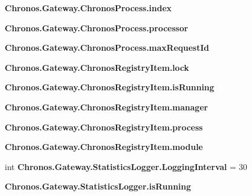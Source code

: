 \begin{DoxyCompactItemize}
\item 
{\bfseries Chronos.\+Gateway.\+Chronos\+Process.\+index}\hypertarget{group__Chronos_gacac8ee011937d5c05c5296d53697dc04}{}\label{group__Chronos_gacac8ee011937d5c05c5296d53697dc04}

\item 
{\bfseries Chronos.\+Gateway.\+Chronos\+Process.\+processor}\hypertarget{group__Chronos_ga3bf9ce85da5db54cf7487119bb7b3bfe}{}\label{group__Chronos_ga3bf9ce85da5db54cf7487119bb7b3bfe}

\item 
{\bfseries Chronos.\+Gateway.\+Chronos\+Process.\+max\+Request\+Id}\hypertarget{group__Chronos_ga1a32157777fccaa0507bb2218d55b199}{}\label{group__Chronos_ga1a32157777fccaa0507bb2218d55b199}

\item 
{\bfseries Chronos.\+Gateway.\+Chronos\+Registry\+Item.\+lock}\hypertarget{group__Chronos_ga0181635e808a182c803b27f154e31740}{}\label{group__Chronos_ga0181635e808a182c803b27f154e31740}

\item 
{\bfseries Chronos.\+Gateway.\+Chronos\+Registry\+Item.\+is\+Running}\hypertarget{group__Chronos_gafd43efcb3649bcee2b46c8e10ea0c733}{}\label{group__Chronos_gafd43efcb3649bcee2b46c8e10ea0c733}

\item 
{\bfseries Chronos.\+Gateway.\+Chronos\+Registry\+Item.\+manager}\hypertarget{group__Chronos_ga65e3735b83b41bfcb2ad2989cb06b9cc}{}\label{group__Chronos_ga65e3735b83b41bfcb2ad2989cb06b9cc}

\item 
{\bfseries Chronos.\+Gateway.\+Chronos\+Registry\+Item.\+process}\hypertarget{group__Chronos_ga44fbafdf89d066ab44b51eb43a1e9ad3}{}\label{group__Chronos_ga44fbafdf89d066ab44b51eb43a1e9ad3}

\item 
{\bfseries Chronos.\+Gateway.\+Chronos\+Registry\+Item.\+module}\hypertarget{group__Chronos_gaad1ab36abd075a54e85ddfb222c4a0de}{}\label{group__Chronos_gaad1ab36abd075a54e85ddfb222c4a0de}

\item 
int {\bfseries Chronos.\+Gateway.\+Statistics\+Logger.\+Logging\+Interval} = 30\hypertarget{group__Chronos_gaaac8ce1bb8776cb09a26b177b48c383e}{}\label{group__Chronos_gaaac8ce1bb8776cb09a26b177b48c383e}

\item 
{\bfseries Chronos.\+Gateway.\+Statistics\+Logger.\+is\+Running}\hypertarget{group__Chronos_gaffb7e32e7b08142b43d33b2d980c297c}{}\label{group__Chronos_gaffb7e32e7b08142b43d33b2d980c297c}


\end{DoxyCompactItemize}
